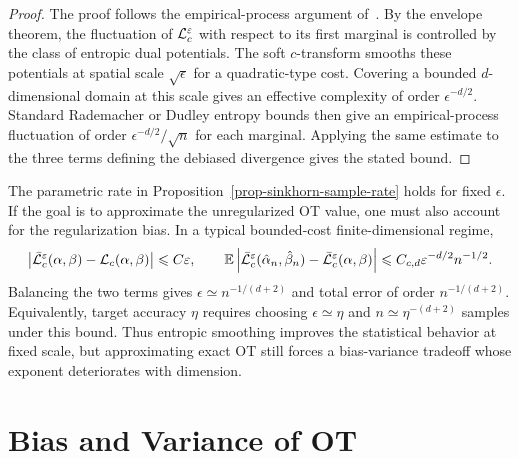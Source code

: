 \begin{proof}
	The proof follows the empirical-process argument of~\cite{genevay2018sample}. By the envelope theorem, the fluctuation of $\mathcal{L}_c^\varepsilon$ with respect to its first marginal is controlled by the class of entropic dual potentials. The soft $c$-transform smooths these potentials at spatial scale $\sqrt\epsilon$ for a quadratic-type cost. Covering a bounded $d$-dimensional domain at this scale gives an effective complexity of order $\epsilon^{-d/2}$. Standard Rademacher or Dudley entropy bounds then give an empirical-process fluctuation of order $\epsilon^{-d/2}/\sqrt n$ for each marginal. Applying the same estimate to the three terms defining the debiased divergence gives the stated bound.
\end{proof}

\begin{rem}\label{rem-sinkhorn-no-free-lunch}
	The parametric rate in Proposition~\ref{prop-sinkhorn-sample-rate} holds for fixed $\epsilon$. If the goal is to approximate the unregularized OT value, one must also account for the regularization bias. In a typical bounded-cost finite-dimensional regime,
	\[
		\left\lvert\bar{\mathcal{L}}_c^\varepsilon(\alpha,\beta)-\mathcal{L}_c(\alpha,\beta)\right\rvert
		\leqslant C\varepsilon,
		\qquad
		\mathbb{E}\left\lvert\bar{\mathcal{L}}_c^\varepsilon(\hat\alpha_n,\hat\beta_n)-\bar{\mathcal{L}}_c^\varepsilon(\alpha,\beta)\right\rvert
		\leqslant C_{c,d}\varepsilon^{-d/2}n^{-1/2}.
	\]
	Balancing the two terms gives $\epsilon\simeq n^{-1/(d+2)}$ and total error of order $n^{-1/(d+2)}$. Equivalently, target accuracy $\eta$ requires choosing $\epsilon\simeq\eta$ and $n\simeq\eta^{-(d+2)}$ samples under this bound. Thus entropic smoothing improves the statistical behavior at fixed scale, but approximating exact OT still forces a bias-variance tradeoff whose exponent deteriorates with dimension.
\end{rem}

\section{Bias and Variance of OT}
\label{sec-bias-variance-ot}

